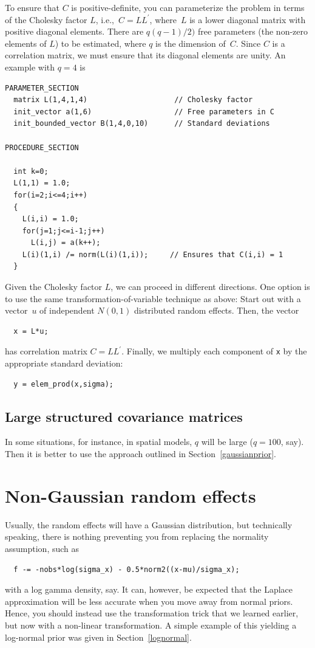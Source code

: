 \documentclass{admbmanual}
\begin{document}
To ensure that $C$ is positive-definite, you can parameterize the problem in
terms of the Cholesky factor $L$, i.e.,~$C=LL^\prime$, where~$L$ is a lower
diagonal matrix with positive diagonal elements. There are $q(q-1)/2)$ free
parameters (the non-zero elements of $L$) to be estimated, where $q$ is the
dimension of~$C$. Since $C$ is a correlation matrix, we must ensure that its
diagonal elements are unity. An example with $q=4$ is
\begin{lstlisting}
PARAMETER_SECTION
  matrix L(1,4,1,4)                    // Cholesky factor
  init_vector a(1,6)                   // Free parameters in C
  init_bounded_vector B(1,4,0,10)      // Standard deviations

PROCEDURE_SECTION

  int k=0;
  L(1,1) = 1.0;
  for(i=2;i<=4;i++)
  {
    L(i,i) = 1.0;
    for(j=1;j<=i-1;j++)
      L(i,j) = a(k++);
    L(i)(1,i) /= norm(L(i)(1,i));     // Ensures that C(i,i) = 1
  }
\end{lstlisting}
Given the Cholesky factor $L$, we can proceed in different directions. One
option is to use the same transformation-of-variable technique as above: Start
out with a vector~$u$ of independent $N(0,1)$ distributed random effects. Then,
the vector
\begin{lstlisting}
  x = L*u;
\end{lstlisting}
has correlation matrix $C=LL^\prime$. Finally, we multiply each component of
\texttt{x} by the appropriate standard deviation:
\begin{lstlisting}
  y = elem_prod(x,sigma);
\end{lstlisting}

\subsection{Large structured covariance matrices}

In some situations, for instance, in spatial models, $q$ will be large ($q=100$,
say). Then it is better to use the approach outlined in
Section~\ref{gaussianprior}.

\section{Non-Gaussian random effects}

Usually, the random effects will have a Gaussian distribution, but technically
speaking, there is nothing preventing you from replacing the normality
assumption, such as
\begin{lstlisting}
  f -= -nobs*log(sigma_x) - 0.5*norm2((x-mu)/sigma_x);
\end{lstlisting}
with a log gamma density, say. It can, however, be expected that the Laplace
approximation will be less accurate when you move away from normal priors.
Hence, you should instead use the transformation trick that we learned earlier,
but now with a non-linear transformation. A simple example of this yielding a
log-normal prior was given in Section~\ref{lognormal}.
\end{document}
